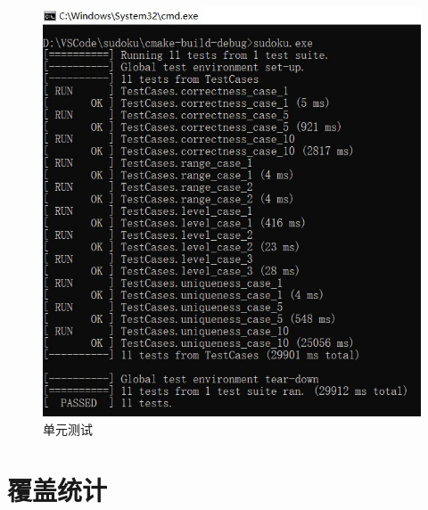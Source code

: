 \documentclass[a4paper]{article}
\begin{document}
\begin{figure}[H]
  \centering
  \includegraphics[scale=0.9]{images/test.jpg}
  \caption{单元测试}
  \label{fig:test}
\end{figure}


\section{覆盖统计}
\end{document}
